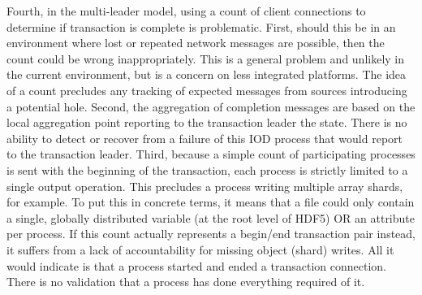 \documentclass[conference]{sig-alt-gov2}
\begin{document}
Fourth, in the multi-leader model, using a count of client connections to
determine if transaction is complete is problematic.  First, should this be in
an environment where lost or repeated network messages are possible, then the
count could be wrong inappropriately. This is a general problem and unlikely
in the current environment, but is a concern on less integrated platforms.
The idea of a count precludes any tracking of expected messages from sources
introducing a potential hole. Second, the aggregation of completion messages
are based on the local aggregation point reporting to the transaction
leader the state.  There is no ability to detect or recover from a failure of
this IOD process that would report to the transaction leader. Third, because a
simple count of participating processes is sent with the beginning of the
transaction, each process is strictly limited to a single output operation.
This precludes a process writing multiple array shards, for example. To put
this in concrete terms, it means that a file could only contain a single,
globally distributed variable (at the root level of HDF5) OR an attribute per
process. If this count actually represents a begin/end transaction pair
instead, it suffers from a lack of accountability for missing object (shard)
writes. All it would indicate is that a process started and ended a transaction
connection. There is no validation that a process has done everything required
of it.
\end{document}
